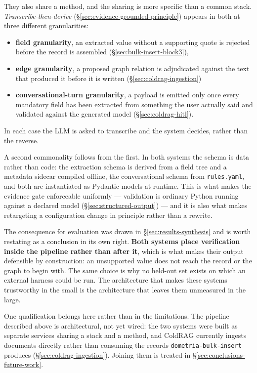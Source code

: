 They also share a method, and the sharing is more specific than a common stack. \emph{Transcribe-then-derive} (\S\ref{sec:evidence-grounded-principle}) appears in both at three different granularities:
\begin{itemize}
\item \textbf{field granularity}, an extracted value without a supporting quote is rejected before the record is assembled (\S\ref{sec:bulk-insert-block3}),
\item \textbf{edge granularity}, a proposed graph relation is adjudicated against the text that produced it before it is written (\S\ref{sec:coldrag-ingestion})
\item \textbf{conversational-turn granularity}, a payload is emitted only once every mandatory field has been extracted from something the user actually said and validated against the generated model (\S\ref{sec:coldrag-hitl}). 
\end{itemize}
In each case the LLM is asked to transcribe and the system decides, rather than the reverse.


A second commonality follows from the first. In both systems the schema is data rather than code: the extraction schema is derived from a field tree and a metadata sidecar compiled offline, the conversational schema from \texttt{rules.yaml}, and both are instantiated as Pydantic models at runtime. This is what makes the evidence gate enforceable uniformly — validation is ordinary Python running against a declared model (\S\ref{sec:structured-output}) — and it is also what makes retargeting a configuration change in principle rather than a rewrite.

The consequence for evaluation was drawn in \S\ref{sec:results-synthesis} and is worth restating as a conclusion in its own right. \textbf{Both systems place verification inside the pipeline rather than after it}, which is what makes their output defensible by construction: an unsupported value does not reach the record or the graph to begin with. The same choice is why no held-out set exists on which an external harness could be run. The architecture that makes these systems trustworthy in the small is the architecture that leaves them unmeasured in the large.

One qualification belongs here rather than in the limitations. The pipeline described above is architectural, not yet wired: the two systems were built as separate services sharing a stack and a method, and ColdRAG currently ingests documents directly rather than consuming the records \texttt{dometria-bulk-insert} produces (\S\ref{sec:coldrag-ingestion}). Joining them is treated in \S\ref{sec:conclusions-future-work}.

